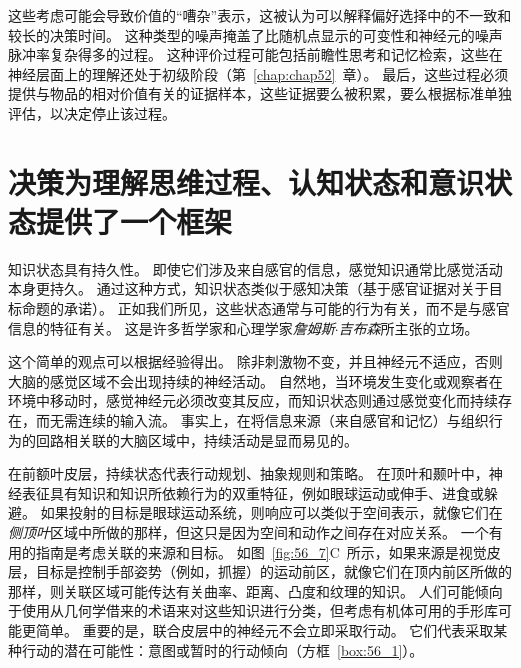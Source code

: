 这些考虑可能会导致价值的“嘈杂”表示，这被认为可以解释偏好选择中的不一致和较长的决策时间。
这种类型的噪声掩盖了比随机点显示的可变性和神经元的噪声脉冲率复杂得多的过程。
这种评价过程可能包括前瞻性思考和记忆检索，这些在神经层面上的理解还处于初级阶段（第~\ref{chap:chap52}~章）。
最后，这些过程必须提供与物品的相对价值有关的证据样本，这些证据要么被积累，要么根据标准单独评估，以决定停止该过程。



\section{决策为理解思维过程、认知状态和意识状态提供了一个框架}

知识状态具有持久性。
即使它们涉及来自感官的信息，感觉知识通常比感觉活动本身更持久。
通过这种方式，知识状态类似于感知决策（基于感官证据对关于目标命题的承诺）。
正如我们所见，这些状态通常与可能的行为有关，而不是与感官信息的特征有关。
这是许多哲学家和心理学家\textit{詹姆斯$\cdot$吉布森}所主张的立场。


这个简单的观点可以根据经验得出。
除非刺激物不变，并且神经元不适应，否则大脑的感觉区域不会出现持续的神经活动。
自然地，当环境发生变化或观察者在环境中移动时，感觉神经元必须改变其反应，而知识状态则通过感觉变化而持续存在，而无需连续的输入流。
事实上，在将信息来源（来自感官和记忆）与组织行为的回路相关联的大脑区域中，持续活动是显而易见的。


在前额叶皮层，持续状态代表行动规划、抽象规则和策略。
在顶叶和颞叶中，神经表征具有知识和知识所依赖行为的双重特征，例如眼球运动或伸手、进食或躲避。
如果投射的目标是眼球运动系统，则响应可以类似于空间表示，就像它们在\textit{侧顶叶}区域中所做的那样，但这只是因为空间和动作之间存在对应关系。
一个有用的指南是考虑关联的来源和目标。
如图~\ref{fig:56_7}C~所示，如果来源是视觉皮层，目标是控制手部姿势（例如，抓握）的运动前区，就像它们在顶内前区所做的那样，则关联区域可能传达有关曲率、距离、凸度和纹理的知识。
人们可能倾向于使用从几何学借来的术语来对这些知识进行分类，但考虑有机体可用的手形库可能更简单。
重要的是，联合皮层中的神经元不会立即采取行动。
它们代表采取某种行动的潜在可能性：意图或暂时的行动倾向（方框~\ref{box:56_1}）。


